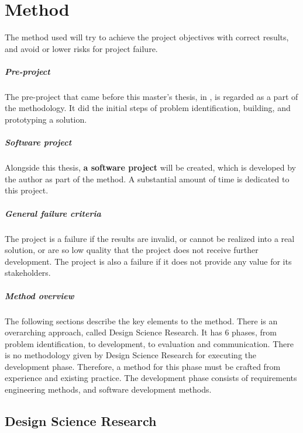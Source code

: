 \chapter{Method}\label{chap:method}

The method used will try to achieve the project objectives with correct results, and avoid or lower risks for project failure.

\paragraph{Pre-project}
The pre-project that came before this master's thesis, in \cite{rekstadModelingEnvironmentCloud2020}, is regarded as a part of the methodology.
It did the initial steps of problem identification, building, and prototyping a solution.

\paragraph{Software project}
Alongside this thesis, \textbf{a software project} will be created, which is developed by the author as part of the method.
A substantial amount of time is dedicated to this project.

\paragraph{General failure criteria}
The project is a failure if the results are invalid, or cannot be realized into a real solution, or are so low quality that the project does not receive further development.
The project is also a failure if it does not provide any value for its stakeholders.

\paragraph{Method overview}
The following sections describe the key elements to the method.
There is an overarching approach, called Design Science Research.
It has 6 phases, from problem identification, to development, to evaluation and communication.
There is no methodology given by Design Science Research for executing the development phase.
Therefore, a method for this phase must be crafted from experience and existing practice.
The development phase consists of requirements engineering methods, and software development methods.


\section{Design Science Research}

